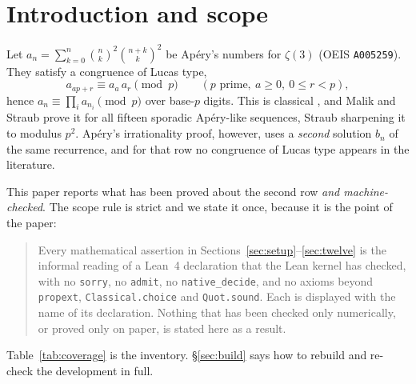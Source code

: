 \documentclass[11pt,reqno]{amsart}
\theoremstyle{plain}
\theoremstyle{definition}
\theoremstyle{remark}
\newcommand{\bin}[2]{\binom{#1}{#2}}
\newcommand{\Ln}[1]{\texttt{#1}}
\numberwithin{equation}{section}
\begin{document}
\section{Introduction and scope}
\label{sec:intro}

Let $a_n=\sum_{k=0}^n\bin nk^2\bin{n+k}k^2$ be Ap\'ery's numbers for $\zeta(3)$ (OEIS
\texttt{A005259}). They satisfy a congruence of Lucas type,
\begin{equation}\label{eq:arow}
   a_{ap+r}\equiv a_a\,a_r\pmod p\qquad(p\text{ prime},\ a\ge0,\ 0\le r<p),
\end{equation}
hence $a_n\equiv\prod_ia_{n_i}\pmod p$ over base-$p$ digits. This is classical
\cite{Gessel1982}, and Malik and Straub \cite{MalikStraub} prove it for all fifteen
sporadic Ap\'ery-like sequences, Straub \cite{Straub2301} sharpening it to modulus $p^2$.
Ap\'ery's irrationality proof, however, uses a \emph{second} solution $b_n$ of the same
recurrence, and for that row no congruence of Lucas type appears in the literature.

This paper reports what has been proved about the second row \emph{and machine-checked}.
The scope rule is strict and we state it once, because it is the point of the paper:

\begin{quote}
Every mathematical assertion in Sections~\ref{sec:setup}--\ref{sec:twelve} is the informal
reading of a Lean~4 declaration that the Lean kernel has checked, with no \Ln{sorry}, no
\Ln{admit}, no \Ln{native\_decide}, and no axioms beyond \Ln{propext},
\Ln{Classical.choice} and \Ln{Quot.sound}. Each is displayed with the name of its
declaration. Nothing that has been checked only numerically, or proved only on paper, is
stated here as a result.
\end{quote}

Table~\ref{tab:coverage} is the inventory. \S\ref{sec:build} says how to rebuild and
re-check the development in full.
\end{document}
